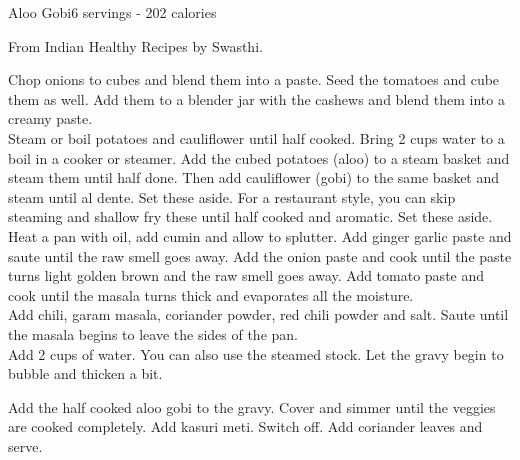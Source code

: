\begin{recipe}{Aloo Gobi}{6 servings - 202 calories}{}

\freeform From Indian Healthy Recipes by Swasthi.


Chop onions to cubes and blend them into a paste. Seed the tomatoes and cube them as well. Add them to a blender jar with the cashews and
blend them into a creamy paste.\\

Steam or boil potatoes and cauliflower until half cooked. Bring 2 cups water to a boil in a cooker or steamer. Add the cubed potatoes (aloo) to a steam basket and steam them until half done. Then add cauliflower (gobi) to the same basket and steam until al dente. Set these aside. For a restaurant style, you can skip steaming and shallow fry these until half cooked and aromatic. Set these aside.\\

Heat a pan with oil, add cumin and allow to splutter. Add ginger garlic paste and saute until the raw smell goes away. Add the onion paste and cook until the paste turns light golden brown and the raw smell goes away. Add tomato paste and cook until the masala turns thick and evaporates all the moisture.\\

Add chili, garam masala, coriander powder, red chili powder and salt. Saute until the masala begins to leave the sides of the pan.\\

Add 2  cups of water. You can also use the steamed stock. Let the gravy begin to bubble and thicken a bit.

Add the half cooked aloo gobi to the gravy. Cover and simmer until the veggies are cooked completely. Add kasuri meti. Switch off. Add coriander leaves and serve.

\end{recipe}